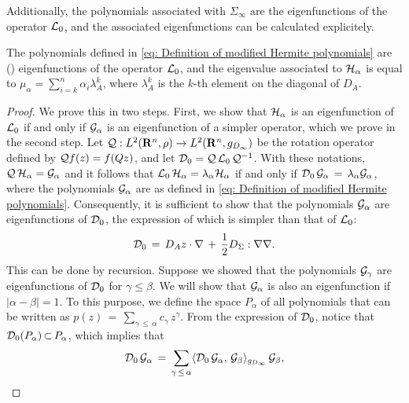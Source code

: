 Additionally, the polynomials associated with $\Sigma_\infty$ are the
eigenfunctions of the operator $\op L_0$, and the associated eigenfunctions can
be calculated explicitely. 
\begin{lemma}[Eigenfunctions of $\op L_0$] 
    The polynomials defined in \eqref{eq: Definition of modified Hermite
    polynomials} are () eigenfunctions of the operator $\op L_0$, and
    the eigenvalue associated to $\mathcal H_{\alpha}$ is equal to
    $\mu_{\alpha}=\sum_{i=k}^n \alpha_i \lambda_A^k$, where $\lambda_A^k$ is the $k$-th
    element on the diagonal of $D_A$.
\end{lemma}

\iflong \begin{proof}
    We prove this in two steps. First, we show that $\mathcal H_\alpha$ is an
    eigenfunction of $\op L_0$ if and only if $\mathcal G_\alpha$ is an
    eigenfunction of a simpler operator, which we prove in the second step. Let
    $\mathcal Q: L^2(\mathbf R^n, \rho) \rightarrow L^2(\mathbf R^n, g_{D_\infty})$ be the
    rotation operator defined by $\mathcal Q f (z) = f(Qz)$, and let $\mathcal D_0 = \mathcal Q \,
    \mathcal L_0 \, \mathcal Q^{-1}$. With these notations, $\mathcal Q \, \mathcal H_\alpha =
    \mathcal G_\alpha$ and it follows that $\mathcal L_0 \, \mathcal H_\alpha = \lambda_\alpha  \mathcal
    H_\alpha$ if and only if $\mathcal D_0 \, \mathcal G_\alpha \,=\, \lambda_\alpha
    \mathcal G_\alpha$, where the polynomials $\mathcal G_{\alpha}$ are as
    defined in \eqref{eq: Definition of modified Hermite polynomials}.
    Consequently, it is sufficient to show that the polynomials $\mathcal
    G_\alpha$ are eigenfunctions of $\mathcal D_0$, the expression of which is simpler
    than that of $\op L_0$:
    $$ \mathcal D_0 \,=\, D_A z \cdot \nabla \,+\, \frac{1}{2}D_{\Sigma}:\nabla\nabla. $$
    This can be done by recursion. Suppose we showed that the polynomials $\mathcal
    G_{\gamma}$ are eigenfunctions of $\mathcal D_0$ for $\gamma \leq \beta$. We
    will show that $\mathcal G_{\alpha}$ is also an eigenfunction if
    $|{\alpha}-{\beta}| = 1$. To this purpose, we define the space $P_{\alpha}$ of
    all polynomials that can be written as $p(z) \,=\, {\sum}_{{\gamma}\, {\leq}
    \,{\alpha}} c_{\gamma}\, z^{\gamma}$. From the expression of $\mathcal D_0$,
    notice that $\mathcal D_0(P_{\alpha}) \,{\subset}\,P_{\alpha}$, which implies that
    $$
        \mathcal D_0 \, \mathcal G_{\alpha}\,=\, \sum_{\gamma\, \leq \, \alpha} \langle \mathcal
        D_0\,\mathcal G_{\alpha},\, \mathcal G_{\beta}\rangle_{g_{D_{\infty}}}\, \mathcal
        G_{\beta},
    $$

\end{proof}
